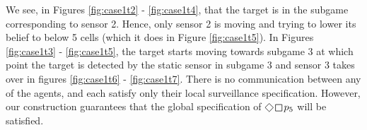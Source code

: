  We see, in Figures \ref{fig:case1t2} - \ref{fig:case1t4}, that the target is in the subgame corresponding to sensor 2. Hence, only sensor 2 is moving and trying to lower its belief to below 5 cells (which it does in Figure \ref{fig:case1t5}). In Figures \ref{fig:case1t3} - \ref{fig:case1t5}, the target starts moving towards subgame 3 at which point the target is detected by the static sensor in subgame 3 and sensor 3 takes over in figures \ref{fig:case1t6} - \ref{fig:case1t7}. There is no communication between any of the agents, and each satisfy only their local surveillance specification. However, our construction guarantees that the global specification of $\LTLfinally \LTLglobally p_5$ will be satisfied. %
 
